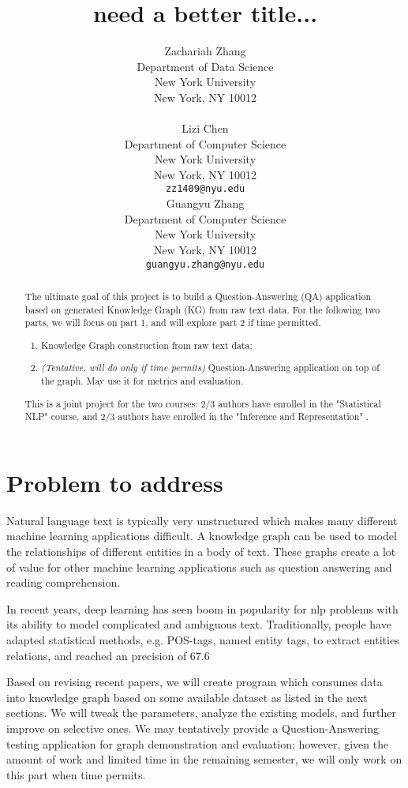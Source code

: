 \documentclass{article}
\title{need a better title...}
\author{
  Zachariah Zhang\\
  Department of Data Science\\
  New York University\\
  New York, NY 10012 \\
  \texttt{} \\
  \And
  Lizi Chen\\
  Department of Computer Science\\
  New York University\\
  New York, NY 10012 \\
  \texttt{zz1409@nyu.edu} \\
  \And
  Guangyu Zhang\\
  Department of Computer Science\\
  New York University\\
  New York, NY 10012 \\
  \texttt{guangyu.zhang@nyu.edu} \\
}
\begin{document}

\maketitle

\begin{abstract}
	The ultimate goal of this project is to build a Question-Answering (QA) application based on generated Knowledge Graph (KG) from raw text data. For the following two parts, we will focus on part 1, and will explore part 2 if time permitted.
	 \begin{enumerate}
	 	\item Knowledge Graph construction from raw text data;
	 	\item \emph{(Tentative, will do only if time permits)} Question-Answering application on top of the graph. May use it for metrics and evaluation.
 	\end{enumerate}
 
	This is a joint project for the two courses: 2/3 authors have enrolled in the "Statistical NLP" course, and 2/3 authors have enrolled in the "Inference and Representation" .
\end{abstract}


\section{Problem to address}

	Natural language text is typically very unstructured which makes many different machine learning applications difficult. A knowledge graph can be used to model the relationships of different entities in a body of text. These graphs create a lot of value for other machine learning applications such as question answering and reading comprehension. 
	
	In recent years, deep learning has seen boom in popularity for nlp problems with its ability to model complicated and ambiguous text. Traditionally, people have adapted statistical methods, e.g. POS-tags, named entity tags, to extract entities relations, and reached an precision of 67.6%
	
	Based on revising recent papers, we will create program which consumes data into knowledge graph based on some available dataset as listed in the next sections. We will tweak the parameters, analyze the existing models, and further improve on selective ones. We may tentatively provide a Question-Answering testing application for graph demonstration and evaluation; however, given the amount of work and limited time in the remaining semester, we will only work on this part when time permits.
  
\end{document}
